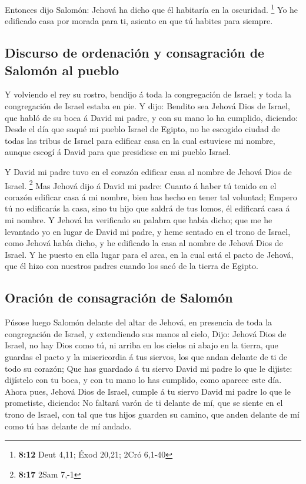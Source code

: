  Entonces dijo Salomón: Jehová ha dicho que él habitaría en
la oscuridad. \footnote{\textbf{8:12} Deut 4,11; Éxod 20,21; 2Cró 6,1-40}
 Yo he edificado casa por morada para ti, asiento en que tú
habites para siempre.

\hypertarget{discurso-de-ordenaciuxf3n-y-consagraciuxf3n-de-salomuxf3n-al-pueblo}{%
\subsection{Discurso de ordenación y consagración de Salomón al
pueblo}\label{discurso-de-ordenaciuxf3n-y-consagraciuxf3n-de-salomuxf3n-al-pueblo}}

 Y volviendo el rey su rostro, bendijo á toda la
congregación de Israel; y toda la congregación de Israel estaba en pie.
 Y dijo: Bendito sea Jehová Dios de Israel, que habló de su
boca á David mi padre, y con su mano lo ha cumplido, diciendo:
 Desde el día que saqué mi pueblo Israel de Egipto, no he
escogido ciudad de todas las tribus de Israel para edificar casa en la
cual estuviese mi nombre, aunque escogí á David para que presidiese en
mi pueblo Israel.

 Y David mi padre tuvo en el corazón edificar casa al
nombre de Jehová Dios de Israel. \footnote{\textbf{8:17} 2Sam 7,-1}
 Mas Jehová dijo á David mi padre: Cuanto á haber tú tenido
en el corazón edificar casa á mi nombre, bien has hecho en tener tal
voluntad;  Empero tú no edificarás la casa, sino tu hijo
que saldrá de tus lomos, él edificará casa á mi nombre.  Y
Jehová ha verificado su palabra que había dicho; que me he levantado yo
en lugar de David mi padre, y heme sentado en el trono de Israel, como
Jehová había dicho, y he edificado la casa al nombre de Jehová Dios de
Israel.  Y he puesto en ella lugar para el arca, en la cual
está el pacto de Jehová, que él hizo con nuestros padres cuando los sacó
de la tierra de Egipto.

\hypertarget{oraciuxf3n-de-consagraciuxf3n-de-salomuxf3n}{%
\subsection{Oración de consagración de
Salomón}\label{oraciuxf3n-de-consagraciuxf3n-de-salomuxf3n}}

 Púsose luego Salomón delante del altar de Jehová, en
presencia de toda la congregación de Israel, y extendiendo sus manos al
cielo,  Dijo: Jehová Dios de Israel, no hay Dios como tú,
ni arriba en los cielos ni abajo en la tierra, que guardas el pacto y la
misericordia á tus siervos, los que andan delante de ti de todo su
corazón;  Que has guardado á tu siervo David mi padre lo
que le dijiste: dijístelo con tu boca, y con tu mano lo has cumplido,
como aparece este día.  Ahora pues, Jehová Dios de Israel,
cumple á tu siervo David mi padre lo que le prometiste, diciendo: No
faltará varón de ti delante de mí, que se siente en el trono de Israel,
con tal que tus hijos guarden su camino, que anden delante de mí como tú
has delante de mí andado.

